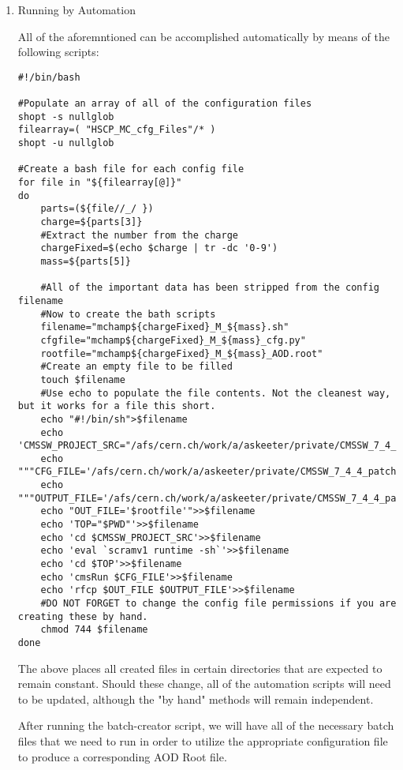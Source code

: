 \documentclass[11pt]{article}
\begin{document}
\begin{enumerate}
\begin{enumerate}
Check your job status with: "bjobs"
Kill jobs with "bkill -J job1"
Using bkill without any job specified will kill ALL of your jobs.

\item Running by Automation
\label{sec-1-1-2-2-2}

All of the aforemntioned can be accomplished automatically by
means of the following scripts:

\begin{verbatim}
#!/bin/bash

#Populate an array of all of the configuration files
shopt -s nullglob
filearray=( "HSCP_MC_cfg_Files"/* )
shopt -u nullglob

#Create a bash file for each config file
for file in "${filearray[@]}"
do
    parts=(${file//_/ })
    charge=${parts[3]}
    #Extract the number from the charge
    chargeFixed=$(echo $charge | tr -dc '0-9')
    mass=${parts[5]}

    #All of the important data has been stripped from the config filename
    #Now to create the bath scripts
    filename="mchamp${chargeFixed}_M_${mass}.sh"
    cfgfile="mchamp${chargeFixed}_M_${mass}_cfg.py"
    rootfile="mchamp${chargeFixed}_M_${mass}_AOD.root"
    #Create an empty file to be filled
    touch $filename
    #Use echo to populate the file contents. Not the cleanest way, but it works for a file this short.
    echo "#!/bin/sh">$filename
    echo 'CMSSW_PROJECT_SRC="/afs/cern.ch/work/a/askeeter/private/CMSSW_7_4_4_patch4/src/"'>>$filename
    echo """CFG_FILE='/afs/cern.ch/work/a/askeeter/private/CMSSW_7_4_4_patch4/src/HSCP_MC_cfg_Files/${cfgfile}'""">>$filename
    echo """OUTPUT_FILE='/afs/cern.ch/work/a/askeeter/private/CMSSW_7_4_4_patch4/src/HSCP_MC_Root_Files/$rootfile'""">>$filename
    echo "OUT_FILE='$rootfile'">>$filename
    echo 'TOP="$PWD"'>>$filename
    echo 'cd $CMSSW_PROJECT_SRC'>>$filename
    echo 'eval `scramv1 runtime -sh`'>>$filename
    echo 'cd $TOP'>>$filename
    echo 'cmsRun $CFG_FILE'>>$filename
    echo 'rfcp $OUT_FILE $OUTPUT_FILE'>>$filename
    #DO NOT FORGET to change the config file permissions if you are creating these by hand.
    chmod 744 $filename
done
\end{verbatim}

The above places all created files in certain directories that
are expected to remain constant. Should these change, all of the
automation scripts will need to be updated, although the "by
hand" methods will remain independent.

After running the batch-creator script, we will have all of the
necessary batch files that we need to run in order to utilize
the appropriate configuration file to produce a corresponding
AOD Root file.


\end{enumerate}
\end{enumerate}
\end{document}
